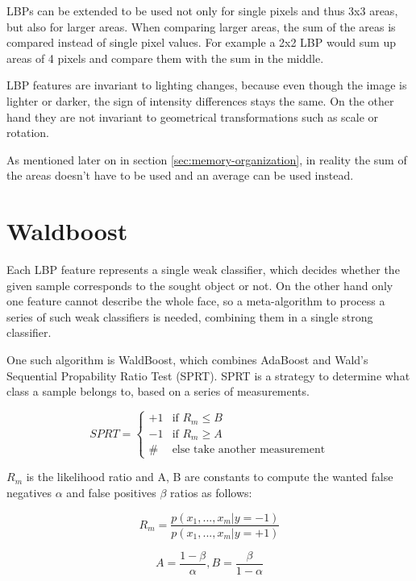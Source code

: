 LBPs can be extended to be used not only for single pixels and thus 3x3 areas, but also for larger areas. When comparing larger areas, the sum of the areas is compared instead of single pixel values. For example a 2x2 LBP would sum up areas of 4 pixels and compare them with the sum in the middle.

LBP features are invariant to lighting changes, because even though the image is lighter or darker, the sign of intensity differences stays the same. On the other hand they are not invariant to geometrical transformations such as scale or rotation.

As mentioned later on in section \ref{sec:memory-organization}, in reality the sum of the areas doesn't have to be used and an average can be used instead.

\section{Waldboost}
\label{sec:waldboost}

Each LBP feature represents a single weak classifier, which decides whether the given sample corresponds to the sought object or not. On the other hand only one feature cannot describe the whole face, so a meta-algorithm to process a series of such weak classifiers is needed, combining them in a single strong classifier.

One such algorithm is WaldBoost, which combines AdaBoost and Wald's Sequential Propability Ratio Test (SPRT). SPRT is a strategy to determine what class a sample belongs to, based on a series of measurements.

\[
 SPRT =
  \begin{cases}
   +1 & \text{if } R_{m} \leq B \\
   -1 & \text{if } R_{m} \geq A \\
   \# & \text{else take another measurement} 
  \end{cases}
\]

$R_{m}$ is the likelihood ratio and A, B are constants to compute the wanted false negatives $\alpha$ and false positives $\beta$ ratios as follows:

\begin{equation}
R_{m}=\frac{p(x_{1}, ..., x_{m}|y=-1)}{p(x_{1}, ..., x_{m}|y=+1)}
\end{equation}

\begin{equation}
A=\frac{1-\beta}{\alpha}, B=\frac{\beta}{1-\alpha}
\end{equation}

